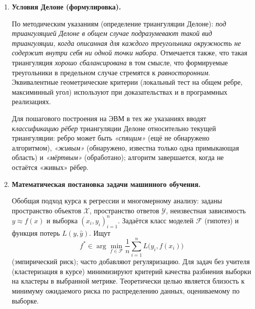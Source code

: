 \documentclass[12pt,a4paper]{article}
\begin{document}
\begin{enumerate}[label=\textbf{\arabic*.}]
\item \textbf{Условия Делоне (формулировка).}

По методическим указаниям (определение триангуляции Делоне): \emph{под триангуляцией Делоне в общем случае подразумевают такой вид триангуляции, когда описанная для каждого треугольника окружность не содержит внутри себя ни одной точки набора}. Отмечается также, что такая триангуляция \emph{хорошо сбалансирована} в том смысле, что формируемые треугольники в предельном случае стремятся к \emph{равносторонним}. Эквивалентные геометрические критерии (локальный тест на общем ребре, максиминный угол) используют при доказательствах и в программных реализациях.

Для пошагового построения на ЭВМ в тех же указаниях вводят \emph{классификацию рёбер} триангуляции Делоне относительно текущей триангуляции: ребро может быть \emph{«спящим»} (ещё не обнаружено алгоритмом), \emph{«живым»} (обнаружено, известна только одна примыкающая область) и \emph{«мёртвым»} (обработано); алгоритм завершается, когда не остаётся «живых» рёбер.

\item \textbf{Математическая постановка задачи машинного обучения.}

Обобщая подход курса к регрессии и многомерному анализу: заданы пространство объектов $\mathcal{X}$, пространство ответов $\mathcal{Y}$, неизвестная зависимость $y \approx f(x)$ и выборка $(x_i,y_i)_{i=1}^n$. Задаётся класс моделей $\mathcal{F}$ (гипотез) и функция потерь $L(y,\hat{y})$. Ищут
\[
f^* \in \arg\min_{f\in\mathcal{F}} \frac1n\sum_{i=1}^n L\bigl(y_i, f(x_i)\bigr)
\]
(эмпирический риск); часто добавляют регуляризацию. Для задач без учителя (кластеризация в курсе) минимизируют критерий качества разбиения выборки на кластеры в выбранной метрике. Теоретически целью является близость к минимуму ожидаемого риска по распределению данных, оцениваемому по выборке.

\end{enumerate}
\end{document}
